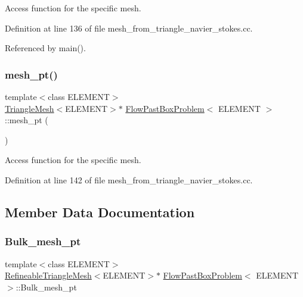Access function for the specific mesh. 



Definition at line 136 of file mesh\+\_\+from\+\_\+triangle\+\_\+navier\+\_\+stokes.\+cc.



Referenced by main().

\mbox{\label{classFlowPastBoxProblem_a3efbee75a2cc6ca9d6ffd4ec0a3a2c52}} 
\subsubsection{\texorpdfstring{mesh\+\_\+pt()}{mesh\_pt()}\hspace{0.1cm}{\footnotesize\ttfamily [2/2]}}
{\footnotesize\ttfamily template$<$class E\+L\+E\+M\+E\+NT$>$ \\
\hyperlink{classoomph_1_1TriangleMesh}{Triangle\+Mesh}$<$E\+L\+E\+M\+E\+NT$>$$\ast$ \hyperlink{classFlowPastBoxProblem}{Flow\+Past\+Box\+Problem}$<$ E\+L\+E\+M\+E\+NT $>$\+::mesh\+\_\+pt (\begin{DoxyParamCaption}{ }\end{DoxyParamCaption})\hspace{0.3cm}{\ttfamily [inline]}}



Access function for the specific mesh. 



Definition at line 142 of file mesh\+\_\+from\+\_\+triangle\+\_\+navier\+\_\+stokes.\+cc.



\subsection{Member Data Documentation}
\mbox{\label{classFlowPastBoxProblem_a5ffdeb61acb20f9c154fafad3c0196e8}} 
\subsubsection{\texorpdfstring{Bulk\+\_\+mesh\+\_\+pt}{Bulk\_mesh\_pt}}
{\footnotesize\ttfamily template$<$class E\+L\+E\+M\+E\+NT$>$ \\
\hyperlink{classoomph_1_1RefineableTriangleMesh}{Refineable\+Triangle\+Mesh}$<$E\+L\+E\+M\+E\+NT$>$$\ast$ \hyperlink{classFlowPastBoxProblem}{Flow\+Past\+Box\+Problem}$<$ E\+L\+E\+M\+E\+NT $>$\+::Bulk\+\_\+mesh\+\_\+pt\hspace{0.3cm}{\ttfamily [private]}}



